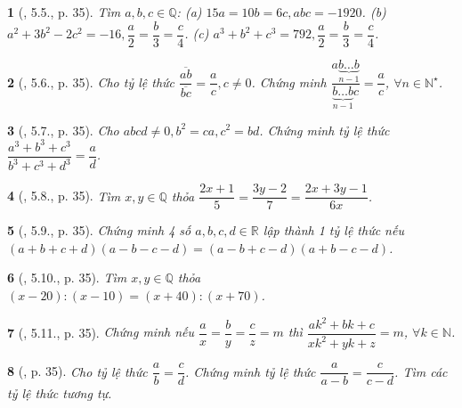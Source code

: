\documentclass{article}
\newtheorem{baitoan}{}
\begin{document}
\begin{baitoan}[\cite{Binh_boi_duong_Toan_7_tap_1}, 5.5., p. 35]
	Tìm $a,b,c\in\mathbb{Q}$: (a) $15a = 10b = 6c,abc = -1920$. (b) $a^2 + 3b^2 - 2c^2 = -16,\dfrac{a}{2} = \dfrac{b}{3} = \dfrac{c}{4}$. (c) $a^3 + b^2 + c^3 = 792,\dfrac{a}{2} = \dfrac{b}{3} = \dfrac{c}{4}$.
\end{baitoan}

\begin{baitoan}[\cite{Binh_boi_duong_Toan_7_tap_1}, 5.6., p. 35]
	Cho tỷ lệ thức $\dfrac{\overline{ab}}{\overline{bc}} = \dfrac{a}{c},c\ne0$. Chứng minh $\dfrac{a\underbrace{b\ldots b}_{n-1}}{\underbrace{b\ldots b}_{n-1}c} = \dfrac{a}{c}$, $\forall n\in\mathbb{N}^\star$.
\end{baitoan}

\begin{baitoan}[\cite{Binh_boi_duong_Toan_7_tap_1}, 5.7., p. 35]
	Cho $abcd\ne0,b^2 = ca,c^2 = bd$. Chứng minh tỷ lệ thức $\dfrac{a^3 + b^3 + c^3}{b^3 + c^3 + d^3} = \dfrac{a}{d}$.
\end{baitoan}

\begin{baitoan}[\cite{Binh_boi_duong_Toan_7_tap_1}, 5.8., p. 35]
	Tìm $x,y\in\mathbb{Q}$ thỏa $\dfrac{2x + 1}{5} = \dfrac{3y - 2}{7} = \dfrac{2x + 3y - 1}{6x}$.
\end{baitoan}

\begin{baitoan}[\cite{Binh_boi_duong_Toan_7_tap_1}, 5.9., p. 35]
	Chứng minh 4 số $a,b,c,d\in\mathbb{R}$ lập thành 1 tỷ lệ thức nếu $(a + b + c + d)(a - b - c - d) = (a - b + c - d)(a + b - c - d)$.
\end{baitoan}

\begin{baitoan}[\cite{Binh_boi_duong_Toan_7_tap_1}, 5.10., p. 35]
	Tìm $x,y\in\mathbb{Q}$ thỏa $(x - 20):(x - 10) = (x + 40):(x + 70)$.
\end{baitoan}

\begin{baitoan}[\cite{Binh_boi_duong_Toan_7_tap_1}, 5.11., p. 35]
	Chứng minh nếu $\dfrac{a}{x} = \dfrac{b}{y} = \dfrac{c}{z} = m$ thì $\dfrac{ak^2 + bk + c}{xk^2 + yk + z} = m$, $\forall k\in\mathbb{N}$.
\end{baitoan}

\begin{baitoan}[\cite{Binh_boi_duong_Toan_7_tap_1}, p. 35]
	Cho tỷ lệ thức $\dfrac{a}{b} = \dfrac{c}{d}$. Chứng minh tỷ lệ thức $\dfrac{a}{a - b} = \dfrac{c}{c - d}$. Tìm các tỷ lệ thức tương tự.
\end{baitoan}
\end{document}

